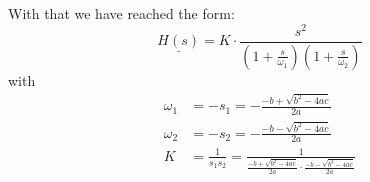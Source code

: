 \documentclass[a4paper]{article}
\begin{document}
With that we have reached the form:
\begin{equation*}
	\underline{H(s)} = K\cdot \frac{s^2}{\left(1+\frac{s}{\omega_1}\right)\left(1+\frac{s}{\omega_2}\right)}
\end{equation*}
with
\begin{align*}
	\omega_1 &= -s_1 = -\frac{-b + \sqrt{b^2 - 4ac}}{2a}\\
	\omega_2 &= -s_2 = -\frac{-b - \sqrt{b^2 - 4ac}}{2a}\\
	K &= \frac{1}{s_1s_2} = \frac{1}{\frac{-b + \sqrt{b^2 - 4ac}}{2a} \cdot \frac{-b - \sqrt{b^2 - 4ac}}{2a}}\\
\end{align*}
\end{document}
